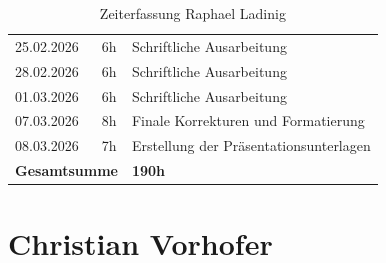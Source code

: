 \begin{table}[H]
\begin{tabular}{|l|c|p{8.5cm}|}
		25.02.2026                                 & 6h            & Schriftliche Ausarbeitung                                                    \\
		28.02.2026                                 & 6h            & Schriftliche Ausarbeitung                                                    \\
		01.03.2026                                 & 6h            & Schriftliche Ausarbeitung                                                    \\
		07.03.2026                                 & 8h            & Finale Korrekturen und Formatierung                                          \\
		08.03.2026                                 & 7h            & Erstellung der Präsentationsunterlagen                                       \\
		\hline
		\multicolumn{2}{|r|}{\textbf{Gesamtsumme}} & \textbf{190h}                                                                \\
		\hline
	\end{tabular}
	\caption{Zeiterfassung Raphael Ladinig}
\end{table}

\section{Christian Vorhofer}

